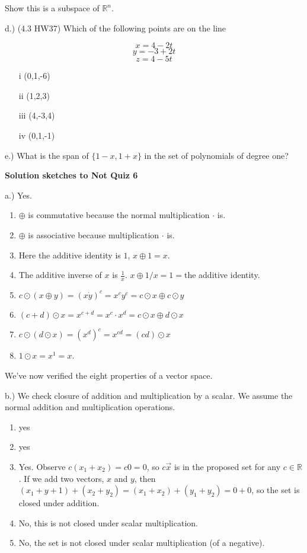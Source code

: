 \documentclass{article}
\begin{document}
Show this is a subspace of $\mathbb{R}^n$. 

d.) (4.3 HW37) Which of the following points are on the line

$$x = 4-2t$$
$$y = -3+2t$$
$$z=4-5t$$

\begin{enumerate}
\item[i] (0,1,-6)
\item[ii] (1,2,3)
\item[iii] (4,-3,4)
\item[iv] (0,1,-1)
\end{enumerate}

e.) What is the span of $\{1-x, 1+x\}$ in the set of polynomials of degree one?



\pagebreak
\textbf{Solution sketches to Not Quiz 6}

a.) Yes. 
\begin{enumerate}
\item $\oplus$ is commutative because the normal multiplication $\cdot$ is. 
\item $\oplus$ is associative because multiplication $\cdot$ is. 
\item Here the additive identity is $1$, $x\oplus 1=x$.
\item The additive inverse of $x$ is $\frac{1}{x}$. $x\oplus 1/x=1=$the additive identity. 

\item $c\odot (x\oplus y) = (x\dot y)^c = x^c y^c = c\odot x \oplus c\odot y$

\item $(c+d)\odot x = x^{c+d} = x^c \cdot x^d = c\odot x \oplus d\odot x$

\item $c\odot (d\odot x) = {(x^d)}^c = x^{cd} = (cd)\odot x$

\item $1\odot x = x^1 = x$.
\end{enumerate}
We've now verified the eight properties of a vector space.

\bigskip

b.) We check closure of addition and multiplication by a scalar. We assume the normal addition and multiplication operations. 
\begin{enumerate}
\item yes
\item yes
\item Yes. Observe $c(x_1+x_2)=c0=0$, so $c\vec{x}$ is in the proposed set for any $c\in\mathbb{R}$. If we add two vectors, $x$ and $y$, then $(x_1+y+1)+(x_2+y_2)=(x_1+x_2)+(y_1+y_2)=0+0$, so the set is closed under addition. 
\item No, this is not closed under scalar multiplication. 
\item No, the set is not closed under scalar multiplication (of a negative). 
\end{enumerate}
\end{document}
